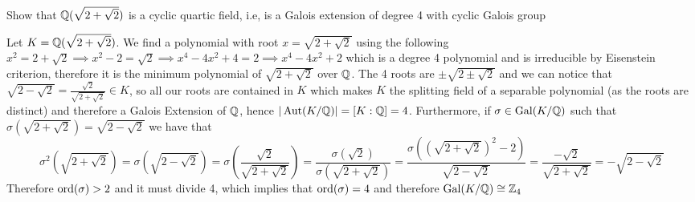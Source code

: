\begin{exercise}
    Show that $\mathbb{Q}(\sqrt{2+\sqrt{2}})$ is a cyclic quartic field, i.e, is a Galois extension of degree 4 with cyclic Galois group
\end{exercise}
\begin{solution}
    Let $K = \mathbb{Q}(\sqrt{2 + \sqrt{2}})$. We find a polynomial with root $x = \sqrt{2+\sqrt{2}}$ using the following $x^2 = 2 + \sqrt{2} \implies x^2 - 2 = \sqrt{2} \implies x^4 -4x^2 + 4 = 2 \implies x^4 - 4x^2 + 2$ which is a degree 4 polynomial and is irreducible by Eisenstein criterion, therefore it is the minimum polynomial of $\sqrt{2 + \sqrt{2}}$ over $\mathbb{Q}$. The 4 roots are $\pm \sqrt{2 \pm \sqrt{2}}$ and we can notice that $\sqrt{2 - \sqrt{2}} = \frac{\sqrt{2}}{\sqrt{2 + \sqrt{2}}} \in K$, so all our roots are contained in $K$ which makes $K$ the splitting field of a separable polynomial (as the roots are distinct) and therefore a Galois Extension of $\mathbb{Q}$, hence $|\operatorname{Aut}(K/\mathbb{Q})| = [K:\mathbb{Q}] = 4$. Furthermore, if $\sigma \in \operatorname{Gal}(K/\mathbb{Q})$ such that $\sigma(\sqrt{2 + \sqrt{2}}) = \sqrt{2 - \sqrt{2}}$ we have that \[\sigma^2(\sqrt{2 + \sqrt{2}}) = \sigma(\sqrt{2 - \sqrt{2}}) = \sigma(\frac{\sqrt{2}}{\sqrt{2 + \sqrt{2}}}) = \frac{\sigma(\sqrt{2})}{\sigma(\sqrt{2 + \sqrt{2}})} = \frac{\sigma((\sqrt{2 + \sqrt{2}})^2 - 2)}{\sqrt{2 - \sqrt{2}}} = \frac{-\sqrt{2}}{\sqrt{2 + \sqrt{2}}} = -\sqrt{2 - \sqrt{2}}\]
    Therefore $\operatorname{ord}(\sigma) > 2$ and it must divide 4, which implies that $\operatorname{ord}(\sigma) = 4$ and therefore $\operatorname{Gal}(K/\mathbb{Q}) \cong \mathbb{Z}_4$
\end{solution}

